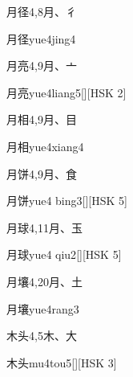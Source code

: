 \begin{entry}{月径}{4,8}{⽉、⼻}
  \begin{phonetics}{月径}{yue4jing4}
  \end{phonetics}
\end{entry}

\begin{entry}{月亮}{4,9}{⽉、⼇}
  \begin{phonetics}{月亮}{yue4liang5}[][HSK 2]
  \end{phonetics}
\end{entry}

\begin{entry}{月相}{4,9}{⽉、⽬}
  \begin{phonetics}{月相}{yue4xiang4}
  \end{phonetics}
\end{entry}

\begin{entry}{月饼}{4,9}{⽉、⾷}
  \begin{phonetics}{月饼}{yue4 bing3}[][HSK 5]
  \end{phonetics}
\end{entry}

\begin{entry}{月球}{4,11}{⽉、⽟}
  \begin{phonetics}{月球}{yue4 qiu2}[][HSK 5]
  \end{phonetics}
\end{entry}

\begin{entry}{月壤}{4,20}{⽉、⼟}
  \begin{phonetics}{月壤}{yue4rang3}
  \end{phonetics}
\end{entry}

\begin{entry}{木头}{4,5}{⽊、⼤}
  \begin{phonetics}{木头}{mu4tou5}[][HSK 3]
  \end{phonetics}
\end{entry}

